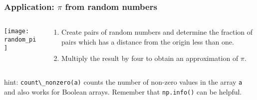 \begin{frame}[fragile]\frametitle{Application: $\pi$ from random numbers}
 \begin{columns}
  \begin{column}{0.4\linewidth}
   \begin{center}
    \texttt{[image: random\_pi]}
   \end{center}
  \end{column}%
  \begin{column}{0.6\linewidth}
   \begin{enumerate}
    \item Create pairs of random numbers and determine the fraction of pairs which
          has a distance from the origin less than one.
    \item Multiply the result by four to obtain an approximation of $\pi$.
   \end{enumerate}
  \end{column}
 \end{columns}

 \vspace{0.5truecm}
 hint: \lstinline{count\_nonzero(a)} counts the number of non-zero values in the array \lstinline{a} and
 also works for Boolean arrays. Remember that \lstinline{np.info()} can be helpful.

\end{frame}

